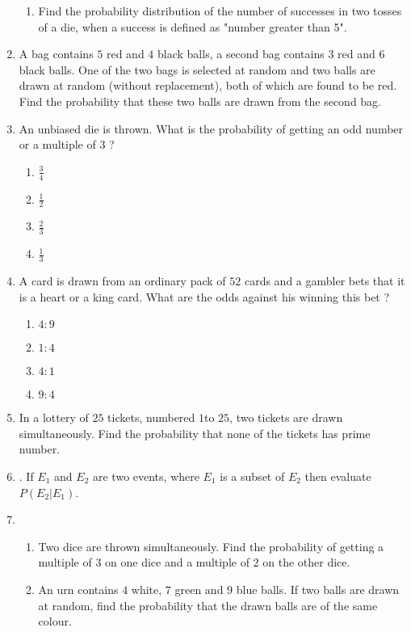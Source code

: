 \documentclass{article}
\begin{document}
\begin{enumerate}
\begin{enumerate}
			\item Find the probability distribution of the number of successes in two tosses of a die, when a success is defined as "number greater than 5".
				\end{enumerate}
			\item A bag contains $5$ red and $4$ black balls, a second bag contains $3$ red and $6$ black balls. One of the two bags is selected at random and two balls are drawn at random (without replacement), both of which are found to be red. Find the probability that these two balls are drawn from the second bag.
		\item An unbiased die is thrown. What is the probability of getting an odd number or a multiple of $3$ ?
		\begin{enumerate}%
			\item $\frac{3}{4}$
				\item $\frac{1}{2}$
                		\item $\frac{2}{3}$
                		\item $\frac{1}{3}$
                        \end{enumerate}
		\item A card is drawn from an ordinary pack of $52$ cards and a gambler bets that it is a heart or a king card. What are the odds against his winning this bet ?
			\begin{enumerate}%
				\item $4:9$
				\item $1:4$
				\item $4:1$
				\item $9:4$
			\end{enumerate}
		\item In a lottery of $25$ tickets, numbered $1 $to $25$, two tickets are drawn simultaneously. Find the probability that none of the tickets has prime number.
		\item . If {$E_{1}$} and {$E_{2}$} are two events, where {$E_{1}$} is a subset of {$E_{2}$} then evaluate {$P( E_{2} |E_{1} )$}.
		\item \begin{enumerate}%
				\item Two dice are thrown simultaneously. Find the probability of getting a multiple of $3$ on one dice and a multiple of $2$ on the other dice.
				\item An urn contains $4$ white, $7$ green and $9$ blue balls. If two balls are drawn at random, find the probability that the drawn balls are of the same colour.
		\end{enumerate}

\end{enumerate}
\end{document}
